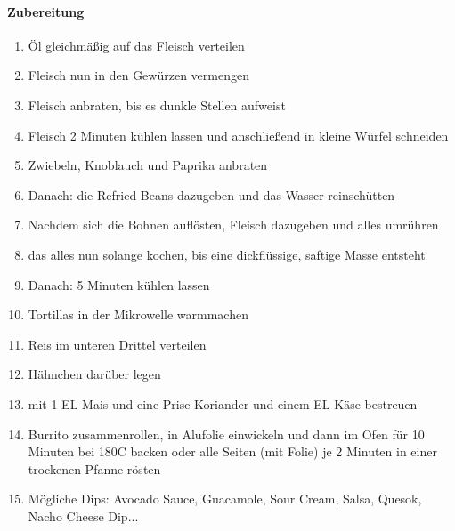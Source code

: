 \paragraph{Zubereitung}
\begin{enumerate}[noitemsep]
	\item Öl gleichmäßig auf das Fleisch verteilen
	\item Fleisch nun in den Gewürzen vermengen 
	\item Fleisch anbraten, bis es dunkle Stellen aufweist
	\item Fleisch 2 Minuten kühlen lassen und anschließend in kleine Würfel schneiden
	\item Zwiebeln, Knoblauch und Paprika anbraten 
	\item Danach: die Refried Beans dazugeben und das Wasser reinschütten
	\item Nachdem sich die Bohnen \glqq{}auflösten\grqq{}, Fleisch dazugeben und alles umrühren
	\item das alles nun solange kochen, bis eine dickflüssige, saftige Masse entsteht
	\item Danach: 5 Minuten kühlen lassen
	\item Tortillas in der Mikrowelle warmmachen
	\item Reis im unteren Drittel verteilen
	\item Hähnchen darüber legen
	\item mit 1 EL Mais und eine \glqq{}Prise\grqq{} Koriander und einem EL Käse bestreuen 
	\item Burrito zusammenrollen, in Alufolie einwickeln und dann im Ofen für 10 Minuten bei 180\textdegree C backen oder alle Seiten (mit Folie) je 2 Minuten in einer trockenen Pfanne rösten
	\item Mögliche Dips: Avocado Sauce, Guacamole, Sour Cream, Salsa, Quesok, Nacho Cheese Dip...
\end{enumerate}
